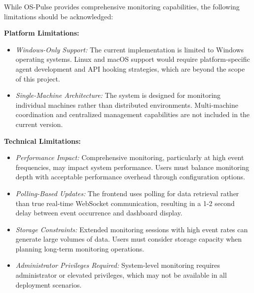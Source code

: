 While OS-Pulse provides comprehensive monitoring capabilities, the following limitations should be acknowledged:

\textbf{Platform Limitations:}
\begin{itemize}
    \item \textit{Windows-Only Support:} The current implementation is limited to Windows operating systems. Linux and macOS support would require platform-specific agent development and API hooking strategies, which are beyond the scope of this project.
    
    \item \textit{Single-Machine Architecture:} The system is designed for monitoring individual machines rather than distributed environments. Multi-machine coordination and centralized management capabilities are not included in the current version.
\end{itemize}

\textbf{Technical Limitations:}
\begin{itemize}
    \item \textit{Performance Impact:} Comprehensive monitoring, particularly at high event frequencies, may impact system performance. Users must balance monitoring depth with acceptable performance overhead through configuration options.
    
    \item \textit{Polling-Based Updates:} The frontend uses polling for data retrieval rather than true real-time WebSocket communication, resulting in a 1-2 second delay between event occurrence and dashboard display.
    
    \item \textit{Storage Constraints:} Extended monitoring sessions with high event rates can generate large volumes of data. Users must consider storage capacity when planning long-term monitoring operations.
    
    \item \textit{Administrator Privileges Required:} System-level monitoring requires administrator or elevated privileges, which may not be available in all deployment scenarios.
\end{itemize}


